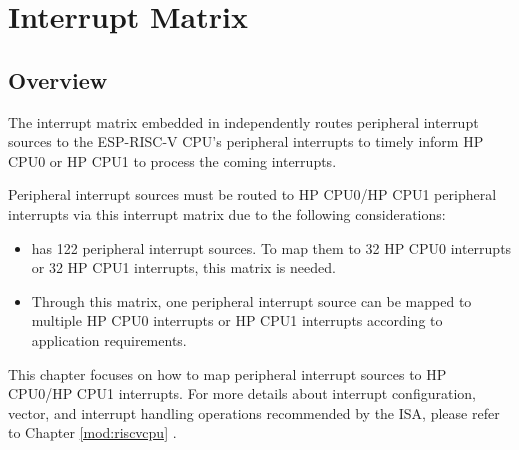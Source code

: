 \documentclass[main\_\_EN.tex]{subfiles}
\begin{document}

\ifglobal
\else
    {\let\clearpage\relax \listoftodos}
    {\let\clearpage\relax \listofdonetodos}
    \tableofcontents
\fi















\hypertarget{intmtrx}{}
\chapter{Interrupt Matrix}
\label{mod:intmtrx}

\section{Overview}

The interrupt matrix embedded in \chipname{} independently routes peripheral interrupt sources to the ESP-RISC-V CPU's peripheral interrupts to timely inform HP CPU0 or HP CPU1 to process the coming interrupts.

Peripheral interrupt sources must be routed to HP CPU0/HP CPU1 peripheral interrupts via this interrupt matrix due to the following considerations:
\begin{itemize}
    \item \chipname{} has 122 peripheral interrupt sources. To map them to 32 HP CPU0 interrupts or 32 HP CPU1 interrupts, this matrix is needed.
    \item Through this matrix, one peripheral interrupt source can be mapped to multiple HP CPU0 interrupts or HP CPU1 interrupts according to application requirements.
\end{itemize}

\begin{tiplisting}
This chapter focuses on how to map peripheral interrupt sources to HP CPU0/HP CPU1 interrupts. For more details about interrupt configuration, vector, and interrupt handling operations recommended by the ISA, please refer to Chapter \ref{mod:riscvcpu} \textit{}.
\end{tiplisting}
\vspace{-1em}
\end{document}
